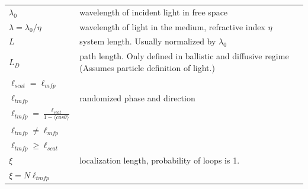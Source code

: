 \begin{center}
\begin{tabular}{ll}
$\lambda_0$ & wavelength of incident light in free space \\ 
$\lambda = \lambda_0/\eta$ & wavelength of light in the medium, refractive index $\eta$ \\ 
$L$ &  system length. Usually normalized by $\lambda_0$ \\ 
$L_D$ & path length. Only defined in ballistic and diffusive regime (Assumes particle definition of light.) \\ 
$\ell_{scat} = \ell_{mfp}$  &  \\ 
$\ell_{tmfp}$ & randomized phase and direction \\ 
$\ell_{tmfp} = \frac{\ell_{scat}}{1-\langle cos \theta \rangle}$ & \\ 
$\ell_{tmfp} \neq \ell_{mfp}$ & \\ 
$\ell_{tmfp} \geqslant \ell_{scat}$ & \\ 
$\xi$ & localization length, probability of loops is 1.  \\ 
$\xi = N \ell_{tmfp}$ &
\end{tabular}
\end{center}

